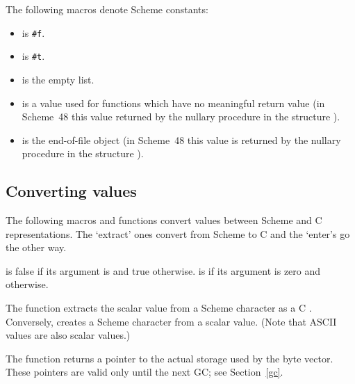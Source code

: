 The following macros denote Scheme constants:
%
\begin{itemize}
\item {} is \verb|#f|.
\item {} is \verb|#t|.
\item {} is the empty list.
\item {} is a value used for functions which have no
  meaningful return value
 (in Scheme~48 this value returned by the nullary procedure 
 in the structure ).
\item {} is the end-of-file object
 (in Scheme~48 this value is returned by the nullary procedure 
 in the structure ).
\end{itemize}

\subsection{Converting values}

The following macros and functions convert values between Scheme and C
 representations.
The `extract' ones convert from Scheme to C and the `enter's go the other
 way.

\begin{protos}
\end{protos}

\noindent{} is false if its argument is
  and true otherwise.
  is  if its argument is zero
  and  otherwise.

The  function extracts the scalar value from
a Scheme character as a C .  Conversely,
 creates a Scheme character from a scalar
value.  (Note that ASCII values are also scalar values.)

 The  function returns a
 pointer to the actual
 storage used by the byte vector.
 These pointers are valid only until the next GC; see Section~\ref{gc}.

